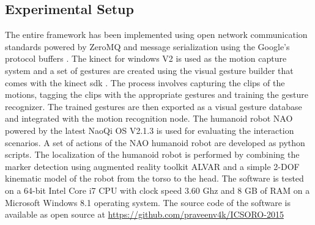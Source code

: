 \documentclass{llncs}
\begin{document}
\subsection{Experimental Setup}
	The entire framework has been implemented using open network communication standards powered by ZeroMQ \cite{ZeroMQ} and message serialization using the Google's protocol buffers \cite{ProtocolBuffers}. The kinect for windows V2 is used as the motion capture system and a set of gestures are created using the visual gesture builder that comes with the kinect sdk \cite{Kinect2014}. The process involves capturing the clips of the motions, tagging the clips with the appropriate gestures and training the gesture recognizer. The trained gestures are then exported as a visual gesture database and integrated with the motion recognition node. The humanoid robot NAO powered by the latest NaoQi OS V2.1.3 is used for evaluating the interaction scenarios.  A set of actions of the NAO humanoid robot are developed as python scripts. The localization of the humanoid robot is performed by combining the marker detection using augmented reality toolkit ALVAR \cite{ALVAR} and a simple 2-DOF kinematic model of the robot from the torso to the head. The software is tested on a 64-bit Intel Core i7 CPU with clock speed 3.60 Ghz and 8 GB of RAM on a Microsoft Windows 8.1 operating system. The source code of the software is available as open source at \url{https://github.com/praveenv4k/ICSORO-2015}
\end{document}
